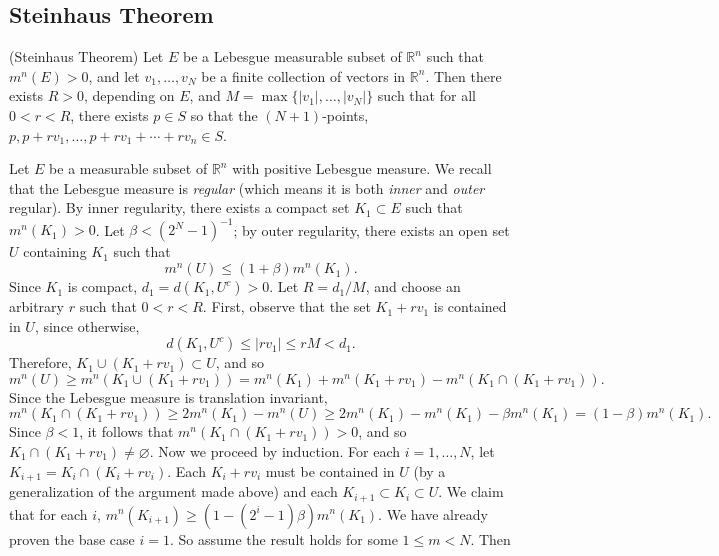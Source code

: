 \documentclass{article}
\begin{document}
\subsection{Steinhaus Theorem}
\begin{prb}{(Steinhaus Theorem)}
	Let $E$ be a Lebesgue measurable subset of $\mathbb{R}^{n}$ such that $m^{n}(E) > 0$, and let $v_{1}, \ldots, v_{N}$ be a finite collection of vectors in $\mathbb{R}^{n}$. Then there exists $R > 0$, depending on $E$, and $M = \max\{|v_{1}|, \ldots, |v_{N}|\}$ such that for all $0 < r < R$, there exists $p \in S$ so that the $(N + 1)$-points, $p, p + rv_{1}, \ldots, p + rv_{1} + \dotsm + rv_{n}\in S$. 
\end{prb}
\begin{solutions}
	Let $E$ be a measurable subset of $\mathbb{R}^{n}$ with positive Lebesgue measure. We recall that the Lebesgue measure is \textit{regular} (which means it is both \textit{inner} and \textit{outer} regular). By inner regularity, there exists a compact set $K_{1} \subset E$ such that $m^{n}(K_{1}) > 0$. Let $\beta < (2^{N} - 1)^{-1}$; by outer regularity, there exists an open set $U$ containing $K_{1}$ such that 
		\begin{equation}
			m^{n}(U) \leq (1 + \beta)m^{n}(K_{1}). 
		\end{equation}
	Since $K_{1}$ is compact, $d_{1} = d(K_{1}, U^{c}) > 0$. Let $R = d_{1}/M$, and choose an arbitrary $r$ such that $0 < r < R$. First, observe that the set $K_{1} + rv_{1}$ is contained in $U$, since otherwise, 
		\begin{equation}
			d(K_{1}, U^{c}) \leq |rv_{1}| \leq rM < d_{1}. 
		\end{equation}
	Therefore, $K_{1} \cup (K_{1} + rv_{1}) \subset U$, and so 
		\begin{equation}
			m^{n}(U) \geq m^{n}(K_{1}\cup (K_{1} + rv_{1})) = m^{n}(K_{1}) + m^{n}(K_{1} + rv_{1}) - m^{n}(K_{1} \cap (K_{1} + rv_{1})). 
		\end{equation}
	Since the Lebesgue measure is translation invariant, 
		\begin{equation}
			m^{n}(K_{1} \cap (K_{1} + rv_{1})) \geq 2m^{n}(K_{1}) - m^{n}(U) \geq 2m^{n}(K_{1}) - m^{n}(K_{1}) - \beta m^{n}(K_{1}) = (1 - \beta)m^{n}(K_{1}). 
		\end{equation}
	Since $\beta < 1$, it follows that $m^{n}(K_{1} \cap (K_{1} + rv_{1})) > 0$, and so $K_{1} \cap (K_{1} + rv_{1}) \neq \varnothing$. Now we proceed by induction. For each $i = 1, \ldots, N$, let $K_{i + 1} = K_{i} \cap (K_{i} + rv_{i})$. Each $K_{i} + rv_{i}$ must be contained in $U$ (by a generalization of the argument made above) and each $K_{i + 1} \subset K_{i} \subset U$. We claim that for each $i$, $m^{n}(K_{i + 1}) \geq (1- (2^{i} - 1)\beta)m^{n}(K_{1})$. We have already proven the base case $i = 1$. So assume the result holds for some $1 \leq m < N$. Then 

\end{solutions}
\end{document}
